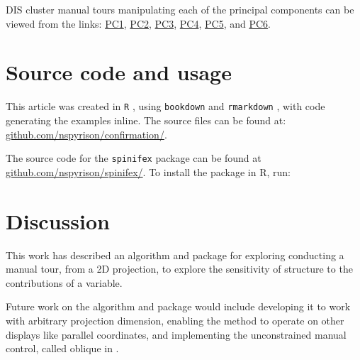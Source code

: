 \documentclass{monashthesis}
\begin{document}
DIS cluster manual tours manipulating each of the principal components
can be viewed from the links:
\href{https://nspyrison.netlify.com/thesis/discluster_manualtour_pc1/}{PC1},
\href{https://nspyrison.netlify.com/thesis/discluster_manualtour_pc2/}{PC2},
\href{https://nspyrison.netlify.com/thesis/discluster_manualtour_pc3/}{PC3},
\href{https://nspyrison.netlify.com/thesis/discluster_manualtour_pc4/}{PC4},
\href{https://nspyrison.netlify.com/thesis/discluster_manualtour_pc5/}{PC5},
and
\href{https://nspyrison.netlify.com/thesis/discluster_manualtour_pc6/}{PC6}.

\section{Source code and usage}\label{source-code-and-usage}

This article was created in \texttt{R} \autocite{r_core_team_r:_2018},
using \texttt{bookdown} \autocite{xie_bookdown:_2016} and
\texttt{rmarkdown} \autocite{xie_r_2018}, with code generating the
examples inline. The source files can be found at:
\href{https://github.com/nspyrison/confirmation/}{github.com/nspyrison/confirmation/}.

The source code for the \texttt{spinifex} package can be found at
\href{https://github.com/nspyrison/spinifex/}{github.com/nspyrison/spinifex/}.
To install the package in R, run:

\begin{Shaded}
\begin{Highlighting}[]
\OperatorTok{::}\NormalTok{(}\NormalTok{)}
\end{Highlighting}
\end{Shaded}

\section{Discussion}\label{sec:discussion_paper}

This work has described an algorithm and package for exploring
conducting a manual tour, from a 2D projection, to explore the
sensitivity of structure to the contributions of a variable.

Future work on the algorithm and package would include developing it to
work with arbitrary projection dimension, enabling the method to operate
on other displays like parallel coordinates, and implementing the
unconstrained manual control, called oblique in
\textcite{cook_manual_1997}.
\end{document}
